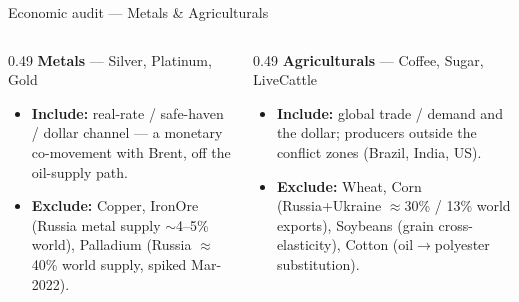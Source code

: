 \documentclass[aspectratio=169,11pt]{beamer}
\newcommand{\smalltext}[1]{{\footnotesize\textcolor{muted}{#1}}}
\newcommand{\hd}[1]{\textbf{#1}}
\begin{document}
\begin{frame}{Economic audit --- Metals \& Agriculturals}
  \footnotesize
  \begin{columns}[T]
    \begin{column}{0.49\textwidth}
      \hd{Metals} \smalltext{--- Silver, Platinum, Gold}
      \begin{itemize}\setlength\itemsep{0.4em}
        \item \hd{Include:} real-rate / safe-haven / dollar channel --- a monetary co-movement with Brent, off
          the oil-supply path.
        \item \hd{Exclude:} Copper, IronOre (Russia metal supply $\sim$4--5\% world), Palladium
          (Russia $\approx$40\% world supply, spiked Mar-2022).
      \end{itemize}
    \end{column}
    \begin{column}{0.49\textwidth}
      \hd{Agriculturals} \smalltext{--- Coffee, Sugar, LiveCattle}
      \begin{itemize}\setlength\itemsep{0.4em}
        \item \hd{Include:} global trade / demand and the dollar; producers outside the conflict zones
          (Brazil, India, US).
        \item \hd{Exclude:} Wheat, Corn (Russia+Ukraine $\approx$30\% / 13\% world exports), Soybeans
          (grain cross-elasticity), Cotton (oil$\rightarrow$polyester substitution).
      \end{itemize}
    \end{column}
  \end{columns}
\end{frame}
\end{document}
